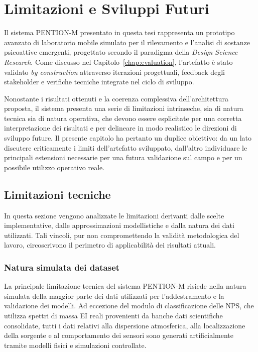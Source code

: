 
\chapter{Limitazioni e Sviluppi Futuri}
\label{chap:limitations}

Il sistema \textsc{PENTION-M} presentato in questa tesi rappresenta un prototipo avanzato di laboratorio mobile simulato per il rilevamento e l’analisi di sostanze psicoattive emergenti, progettato secondo il paradigma della \textit{Design Science Research}.
Come discusso nel Capitolo~\ref{chap:evaluation}, l’artefatto è stato validato \textit{by construction} attraverso iterazioni progettuali, feedback degli stakeholder e verifiche tecniche integrate nel ciclo di sviluppo.

Nonostante i risultati ottenuti e la coerenza complessiva dell’architettura proposta, il sistema presenta una serie di limitazioni intrinseche, sia di natura tecnica sia di natura operativa, che devono essere esplicitate per una corretta interpretazione dei risultati e per delineare in modo realistico le direzioni di sviluppo future.
Il presente capitolo ha pertanto un duplice obiettivo: da un lato discutere criticamente i limiti dell’artefatto sviluppato, dall’altro individuare le principali estensioni necessarie per una futura validazione sul campo e per un possibile utilizzo operativo reale.

\section{Limitazioni tecniche}

In questa sezione vengono analizzate le limitazioni derivanti dalle scelte implementative, dalle approssimazioni modellistiche e dalla natura dei dati utilizzati. Tali vincoli, pur non compromettendo la validità metodologica del lavoro, circoscrivono il perimetro di applicabilità dei risultati attuali.

\subsection{Natura simulata dei dataset}

La principale limitazione tecnica del sistema \textsc{PENTION-M} risiede nella natura simulata della maggior parte dei dati utilizzati per l’addestramento e la validazione dei modelli.
Ad eccezione del modulo di classificazione delle NPS, che utilizza spettri di massa EI reali provenienti da banche dati scientifiche consolidate, tutti i dati relativi alla dispersione atmosferica, alla localizzazione della sorgente e al comportamento dei sensori sono generati artificialmente tramite modelli fisici e simulazioni controllate.


